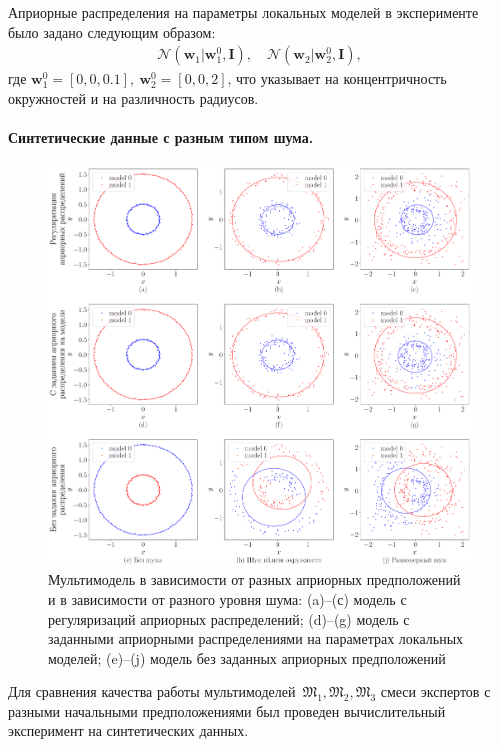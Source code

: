 \documentclass[12pt, twoside]{article}
\numberwithin{equation}{section}
\begin{document}
Априорные распределения на параметры локальных моделей в эксперименте было задано следующим образом:
\begin{equation}
\label{eq:ce:1}
\begin{aligned}
\mathcal{N}\left(\textbf{w}_1|\textbf{w}^{0}_{1}, \textbf{I}\right), \quad \mathcal{N}\left(\textbf{w}_2|\textbf{w}^{0}_{2}, \textbf{I}\right),
\end{aligned}
\end{equation}
где $\textbf{w}^{0}_1 = [0, 0, 0.1],\ \textbf{w}^{0}_2 = [0, 0, 2]$, что указывает на концентричность окружностей и на различность радиусов.

\paragraph{Синтетические данные с разным типом шума.}
\begin{figure}[h!t]\center
\includegraphics[width=1\textwidth]{result/experiment_synthetic}
\caption{Мультимодель в зависимости от разных априорных предположений и в зависимости от разного уровня шума: (a)--(с) модель с регуляризаций априорных распределений; (d)--(g) модель с заданными априорными распределениями на параметрах локальных моделей; (e)--(j) модель без заданных априорных предположений}
\label{experiment:1}
\end{figure}

Для сравнения качества работы мультимоделей~$\mathfrak{M}_1, \mathfrak{M}_2, \mathfrak{M}_3$ смеси экспертов с разными начальными предположениями был проведен вычислительный эксперимент на синтетических данных. 
\end{document}
